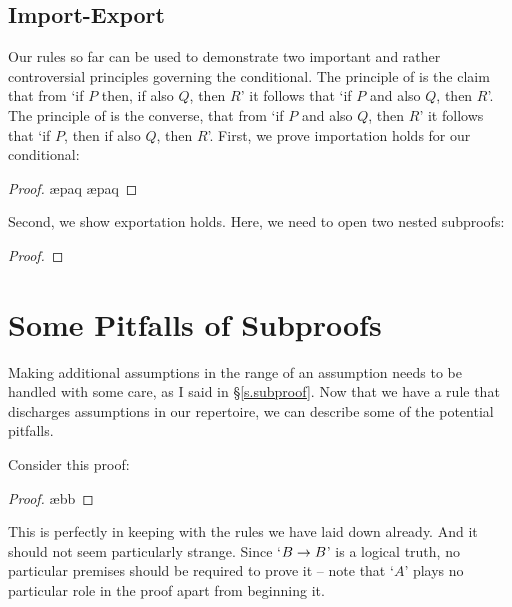 \subsection{Import-Export}\label{import.export}
Our rules so far can be used to demonstrate two important and rather controversial principles governing the conditional. The principle of  is the claim that from `if $P$ then, if also $Q$, then $R$' it follows that `if $P$ and also $Q$, then $R$'. The principle of  is the converse, that from `if $P$ and also $Q$, then $R$' it follows that `if $P$, then if also $Q$, then $R$'. First, we prove importation holds for our conditional: \begin{proof}
	\open
	\ae{paq}
	\ae{paq}
	\close
\end{proof}
Second, we show exportation holds. Here, we need to open two nested subproofs:
\begin{proof}
	\open
	\open
	\close
	\close
\end{proof}


\section{Some Pitfalls of Subproofs}\label{pitfalls}


Making additional assumptions in the range of an assumption needs to be handled with some care, as I said in §\ref{s.subproof}. Now that we have a rule that discharges assumptions in our repertoire, we can describe some of the potential pitfalls.

Consider this proof:
\begin{proof}
	\open
		 \ae{bb}
	\close
\end{proof}
This is perfectly in keeping with the rules we have laid down already. And it should not seem particularly strange. Since `$B \rightarrow B$' is a logical truth, no particular premises should be required to prove it – note that `$A$' plays no particular role in the proof apart from beginning it. 

